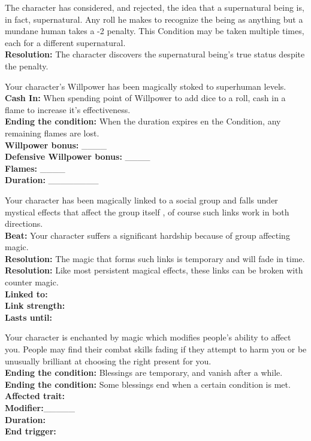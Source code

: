 \documentclass[10pt, frontgrid, backgrid]{flacards}
\begin{document}
{The character has considered, and rejected, the idea that a supernatural being is, in fact, supernatural. Any roll he makes to recognize the being as anything but a mundane human takes a -2 penalty. This Condition may be taken multiple times, each for a different supernatural.\\
\textbf{Resolution:} The character discovers the supernatural being’s true status despite the penalty. 
}

{Your character's Willpower has been magically stoked to superhuman levels. \\
\textbf{Cash In:} When spending point of Willpower to add dice to a roll, cash in a flame to increase it's effectiveness. \\
\textbf{Ending the condition:} When the duration expires en the Condition, any remaining flames are lost. \\
\textbf{Willpower bonus:} \_\_\_\_\\ 
\textbf{Defensive Willpower bonus:} \_\_\_\_\\
\textbf{Flames:} \_\_\_\_\\
\textbf{Duration:} \_\_\_\_\_\_\_\_
}

{Your character has been magically linked to a social group and falls under mystical effects that affect the group itself , of course such links work in both directions. \\
\textbf{Beat:} Your character suffers a significant hardship because of group affecting magic.\\
\textbf{Resolution:} The magic that forms such links is temporary and will fade in time. \\
\textbf{Resolution:} Like most persistent magical effects, these links can be broken with counter magic. \\
\textbf{Linked to:}\fillunderline \\
\textbf{Link strength:}\fillunderline \\
\textbf{Lasts until:}\fillunderline 
}


{Your character is enchanted by magic which modifies people's ability to affect you. People may find their combat skills fading if they attempt to harm you or be unusually brilliant at choosing the right present for you.\\
\textbf{Ending the condition:} Blessings are temporary, and vanish after a while.\\
\textbf{Ending the condition:} Some blessings end when a certain condition is met.\\
\textbf{Affected trait:}\fillunderline\\
\textbf{Modifier:}\_\_\_\_\_\\
\textbf{Duration:}\fillunderline\\
\textbf{End trigger:}\fillunderline}
\end{document}
